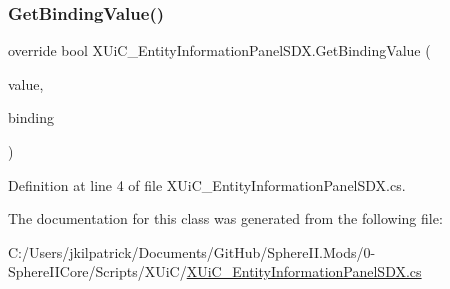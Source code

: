 \subsubsection{\texorpdfstring{GetBindingValue()}{GetBindingValue()}}
{\footnotesize\ttfamily override bool X\+Ui\+C\+\_\+\+Entity\+Information\+Panel\+S\+D\+X.\+Get\+Binding\+Value (\begin{DoxyParamCaption}\item[{ref string}]{value,  }\item[{Binding\+Item}]{binding }\end{DoxyParamCaption})}



Definition at line 4 of file X\+Ui\+C\+\_\+\+Entity\+Information\+Panel\+S\+D\+X.\+cs.



The documentation for this class was generated from the following file\+:\begin{DoxyCompactItemize}
\item 
C\+:/\+Users/jkilpatrick/\+Documents/\+Git\+Hub/\+Sphere\+I\+I.\+Mods/0-\/\+Sphere\+I\+I\+Core/\+Scripts/\+X\+Ui\+C/\mbox{\hyperlink{_x_ui_c___entity_information_panel_s_d_x_8cs}{X\+Ui\+C\+\_\+\+Entity\+Information\+Panel\+S\+D\+X.\+cs}}\end{DoxyCompactItemize}
